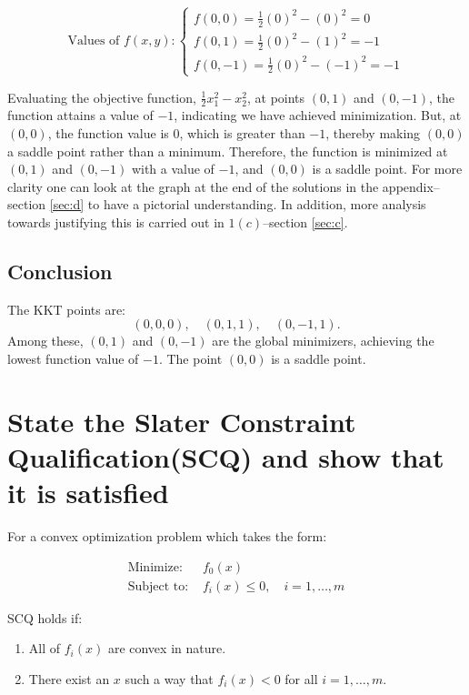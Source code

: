 \documentclass{article}
\begin{document}
\begin{equation}
\text{Values of } f(x,y):
\begin{cases}
f(0,0) = \frac{1}{2}(0)^2 - (0)^2 = 0 \\
f(0,1) = \frac{1}{2}(0)^2 - (1)^2 = -1 \\
f(0,-1) = \frac{1}{2}(0)^2 - (-1)^2 = -1
\end{cases}
\end{equation}

Evaluating the objective function, $\frac{1}{2}x_1^2 - x_2^2$, at points $(0,1)$ and $(0,-1)$, the function attains a value of $-1$, indicating we have achieved minimization. But, at $(0,0)$, the function value is $0$, which is greater than $-1$, thereby making $(0,0)$ a saddle point rather than a minimum. Therefore, the function is minimized at $(0,1)$ and $(0,-1)$ with a value of $-1$, and $(0,0)$ is a saddle point. For more clarity one can look at the graph at the end of the solutions in the appendix--section \ref{sec:d} to have a pictorial understanding. In addition, more analysis towards justifying this is carried out in $1(c)$--section \ref{sec:c}.

\subsection{Conclusion}

The KKT points are:
\[
(0,0,0), \quad (0,1,1), \quad (0,-1,1).
\]
Among these, $(0,1)$ and $(0,-1)$ are the global minimizers, achieving the lowest function value of $-1$. The point $(0,0)$ is a saddle point.

\newpage
\section{State the Slater Constraint Qualification(SCQ) and show that it is satisfied}\label{sec:b}


For a convex optimization problem which takes the form:

\begin{align*}
\text{Minimize: } & f_0(x) \\
\text{Subject to: } & f_i(x) \leq 0, \quad i = 1, \ldots, m
\end{align*}

SCQ holds if:

\begin{enumerate}
    \item All of $f_i(x)$ are convex in  nature.
    \item There exist an $x$ such a way that $f_i(x) < 0$ for all $i = 1, \ldots, m$.
\end{enumerate}
\end{document}
